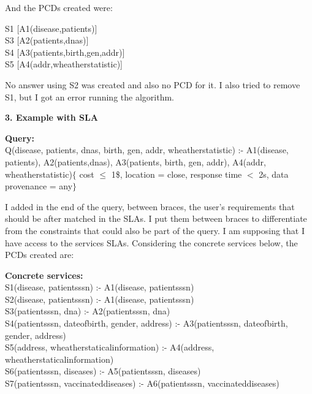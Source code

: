 \documentclass[12pt,a4paper,oneside]{report}
\begin{document}
And the PCDs created were:
\begin{flushleft}
S1 [A1(disease,patients)] \\
S3 [A2(patients,dnas)] \\
S4 [A3(patients,birth,gen,addr)] \\
S5 [A4(addr,wheatherstatistic)]
\end{flushleft}

No answer using S2 was created and also no PCD for it. I also tried to remove S1, but I got an error running the algorithm.

\begin{flushleft}
\textbf{3. Example with SLA}
\end{flushleft}

\begin{flushleft}
\textbf{Query:} \\
Q(disease, patients, dnas, birth, gen, addr, wheatherstatistic) :- A1(disease, patients), A2(patients,dnas), A3(patients, birth, gen, addr), A4(addr, wheatherstatistic)$\lbrace$ cost $\leq$ 1\$, location = close, response time $<$ 2s, data provenance = any$\rbrace$ \\
\end{flushleft}

I added in the end of the query, between braces, the user's requirements that should be after matched in the SLAs. I put them between braces to differentiate from the constraints that could also be part of the query. I am supposing that I have access to the services SLAs. Considering the concrete services below, the PCDs created are:

\begin{flushleft}
\textbf{Concrete services:} \\
S1(disease, patientsssn) :- A1(disease, patientsssn)\\
S2(disease, patientsssn) :- A1(disease, patientsssn)\\
S3(patientsssn, dna) :- A2(patientsssn, dna)\\
S4(patientsssn, dateofbirth, gender, address) :- A3(patientsssn, dateofbirth, gender, address)\\
S5(address, wheatherstaticalinformation) :- A4(address, wheatherstaticalinformation)\\
S6(patientsssn, diseases) :- A5(patientsssn, diseases)\\
S7(patientsssn, vaccinateddiseases) :- A6(patientsssn, vaccinateddiseases)\\
\end{flushleft}
\end{document}
